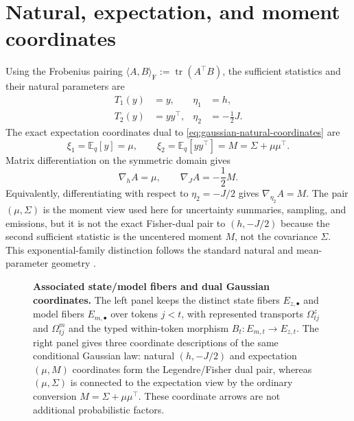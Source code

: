 \section{Natural, expectation, and moment coordinates}

Using the Frobenius pairing $\langle A,B\rangle_{\mathrm F}:=\operatorname{tr}(A^\top B)$, the sufficient statistics and their natural parameters are
\begin{equation}
\begin{aligned}
T_1(y)&=y,
&\eta_1&=h,\\
T_2(y)&=yy^\top,
&\eta_2&=-\frac12J.
\end{aligned}
\label{eq:gaussian-natural-coordinates}
\end{equation}
The exact expectation coordinates dual to \cref{eq:gaussian-natural-coordinates} are
\begin{equation}
\xi_1=\mathbb E_q[y]=\mu,
\qquad
\xi_2=\mathbb E_q[yy^\top]
=M=\Sigma+\mu\mu^\top.
\label{eq:gaussian-expectation-coordinates}
\end{equation}
Matrix differentiation on the symmetric domain gives
\begin{equation}
\nabla_hA=\mu,
\qquad
\nabla_JA=-\frac12M.
\label{eq:gaussian-log-normalizer-gradients}
\end{equation}
Equivalently, differentiating with respect to $\eta_2=-J/2$ gives $\nabla_{\eta_2}A=M$.  The pair $(\mu,\Sigma)$ is the moment view used here for uncertainty summaries, sampling, and emissions, but it is not the exact Fisher-dual pair to $(h,-J/2)$ because the second sufficient statistic is the uncentered moment $M$, not the covariance $\Sigma$.  This exponential-family distinction follows the standard natural and mean-parameter geometry \citep{Wainwright2008,Amari2016}.

\begin{figure}[htbp]
\centering
\resizebox{\textwidth}{!}{}
\caption{%
\textbf{Associated state/model fibers and dual Gaussian coordinates.}
The left panel keeps the distinct state fibers $E_{z,\bullet}$ and model fibers $E_{m,\bullet}$ over tokens $j<t$, with represented transports $\Omega^z_{tj}$ and $\Omega^m_{tj}$ and the typed within-token morphism $B_t:E_{m,t}\to E_{z,t}$. The right panel gives three coordinate descriptions of the same conditional Gaussian law: natural $(h,-J/2)$ and expectation $(\mu,M)$ coordinates form the Legendre/Fisher dual pair, whereas $(\mu,\Sigma)$ is connected to the expectation view by the ordinary conversion $M=\Sigma+\mu\mu^\top$. These coordinate arrows are not additional probabilistic factors.
}
\label{fig:vfe4-bundle-dual-coordinates}
\end{figure}

